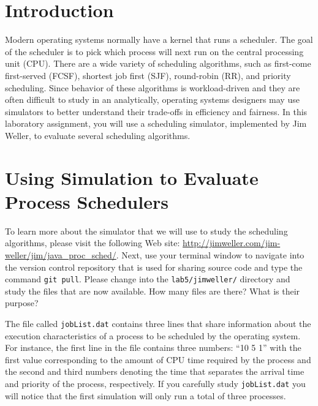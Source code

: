 


\usepackage[compact]{titlesec}



\section*{Introduction}

  Modern operating systems normally have a kernel that runs a scheduler.  The goal of the scheduler is to pick which
  process will next run on the central processing unit (CPU).  There are a wide variety of scheduling algorithms, such
  as first-come first-served (FCSF), shortest job first (SJF), round-robin (RR), and priority scheduling.  Since
  behavior of these algorithms is workload-driven and they are often difficult to study in an analytically, operating
  systems designers may use simulators to better understand their trade-offs in efficiency and fairness. In this
  laboratory assignment, you will use a scheduling simulator, implemented by Jim Weller, to evaluate several scheduling
  algorithms.


\section*{Using Simulation to Evaluate Process Schedulers}

  To learn more about the simulator that we will use to study the scheduling algorithms, please visit the following Web
  site: \url{http://jimweller.com/jim-weller/jim/java_proc_sched/}. Next, use your terminal window to navigate into the
  version control repository that is used for sharing source code and type the command {\tt git pull}.  Please change
  into the {\tt lab5/jimweller/} directory and study the files that are now available. How many files are there? What is
  their purpose?

  The file called {\tt jobList.dat} contains three lines that share information about the execution characteristics of a
  process to be scheduled by the operating system.  For instance, the first line in the file contains three numbers: ``10
  5 1'' with the first value corresponding to the amount of CPU time required by the process and the second and third
  numbers denoting the time that separates the arrival time and priority of the process, respectively. If you carefully
  study {\tt jobList.dat} you will notice that the first simulation will only run a total of three processes.

